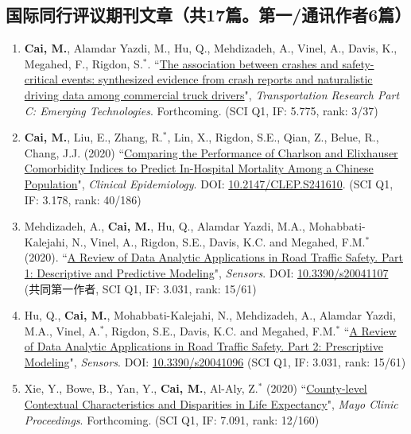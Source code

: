 \documentclass[11pt, a4paper]{article}
\newcommand{\years}[1]{\marginnote{\scriptsize #1}}
\begin{document}
	\subsection*{国际同行评议期刊文章（共17篇。第一/通讯作者6篇）}
	\begin{enumerate}[leftmargin=0ex,itemsep=1ex]
		\item \years{2020}\textcolor{RubineRed}{\textbf{Cai, M.}}, Alamdar Yazdi, M., Hu, Q., Mehdizadeh, A., Vinel, A., Davis, K., Megahed, F., Rigdon, S.$^\ast$. ``\ul{The association between crashes and safety-critical events: synthesized evidence from crash reports and naturalistic driving data among commercial truck drivers}", \emph{Transportation Research Part C: Emerging Technologies}. Forthcoming. (SCI Q1, IF: 5.775, rank: 3/37)
		
		\item \textcolor{RubineRed}{\textbf{Cai, M.}}, Liu, E., Zhang, R.$^\ast$, Lin, X., Rigdon, S.E., Qian, Z., Belue, R., Chang, J.J. (2020) ``\ul{Comparing the Performance of Charlson and Elixhauser Comorbidity Indices to Predict In-Hospital Mortality Among a Chinese Population}", \emph{Clinical Epidemiology}. DOI: \href{https://doi.org/10.2147/CLEP.S241610}{10.2147/CLEP.S241610}. (SCI Q1, IF: 3.178, rank: 40/186)
		
		\item Mehdizadeh, A., \textcolor{RubineRed}{\textbf{Cai, M.}}, Hu, Q., Alamdar Yazdi, M.A., Mohabbati-Kalejahi, N., Vinel, A., Rigdon, S.E., Davis, K.C. and Megahed, F.M.$^\ast$ (2020). ``\ul{A Review of Data Analytic Applications in Road Traffic Safety. Part 1: Descriptive and Predictive Modeling}", \emph{Sensors}. DOI: \href{https://doi.org/10.3390/s20041107}{10.3390/s20041107} (共同第一作者, SCI Q1, IF: 3.031, rank: 15/61)
		
		\item Hu, Q., \textbf{Cai, M.}, Mohabbati-Kalejahi, N., Mehdizadeh, A., Alamdar Yazdi, M.A., Vinel, A.$^\ast$, Rigdon, S.E., Davis, K.C. and Megahed, F.M.$^\ast$ ``\ul{A Review of Data Analytic Applications in Road Traffic Safety. Part 2: Prescriptive Modeling}", \emph{Sensors}. DOI: \href{https://doi.org/10.3390/s20041096}{10.3390/s20041096} (SCI Q1, IF: 3.031, rank: 15/61)
		
		\item Xie, Y., Bowe, B., Yan, Y., \textbf{Cai, M.}, Al-Aly, Z.$^\ast$ (2020) ``\ul{County-level Contextual Characteristics and Disparities in Life Expectancy}", \emph{Mayo Clinic Proceedings}. Forthcoming. (SCI Q1, IF: 7.091, rank: 12/160)
		

\end{enumerate}
\end{document}
